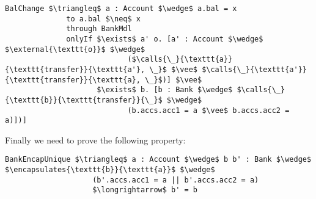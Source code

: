 \documentclass[acmsmall,review,anonymous]{acmart}\settopmatter{printfolios=true,printccs=false,printacmref=false}
\begin{document}
\begin{lstlisting}[language = Chainmail, mathescape=true, frame=lines]
BalChange $\triangleq$ a : Account $\wedge$ a.bal = x
              to a.bal $\neq$ x
              through BankMdl
              onlyIf $\exists$ a' o. [a' : Account $\wedge$ $\external{\texttt{o}}$ $\wedge$ 
                            ($\calls{\_}{\texttt{a}}{\texttt{transfer}}{\texttt{a'}, \_}$ $\vee$ $\calls{\_}{\texttt{a'}}{\texttt{transfer}}{\texttt{a}, \_}$)] $\vee$
                     $\exists$ b. [b : Bank $\wedge$ $\calls{\_}{\texttt{b}}{\texttt{transfer}}{\_}$ $\wedge$ 
                            (b.accs.acc1 = a $\vee$ b.accs.acc2 = a)])]
\end{lstlisting}
Finally we need to prove the following property:
\begin{lstlisting}[language = Chainmail, mathescape=true, frame=lines]
BankEncapUnique $\triangleq$ a : Account $\wedge$ b b' : Bank $\wedge$ $\encapsulates{\texttt{b}}{\texttt{a}}$ $\wedge$
                    (b'.accs.acc1 = a || b'.accs.acc2 = a)
                    $\longrightarrow$ b' = b
\end{lstlisting}
\end{document}
